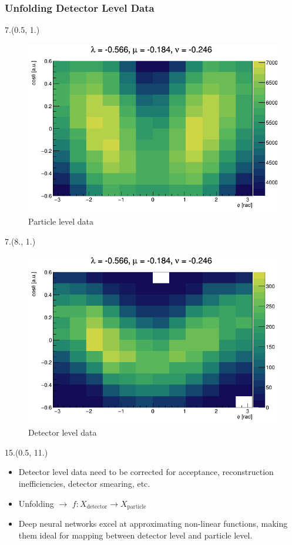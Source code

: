 \documentclass[12pt, xcolor={dvipsnames}, aspectratio = 169, sans, mathserif]{beamer}
\newenvironment{List}[2]
{\begin{textblock}{#1}#2
\begin{itemize}}
{\end{itemize}
\end{textblock}}
\newenvironment{Pic}[2]
{\begin{textblock}{#1}#2
\begin{figure}}
{\end{figure}
\end{textblock}}
\begin{document}
\begin{frame}
\frametitle{Unfolding Detector Level Data}

\begin{Pic}{7.}{(0.5, 1.)}
  \caption{Particle level data}
  \includegraphics[width=7.cm]{imgs/particle_level.png}
\end{Pic}

\begin{Pic}{7.}{(8., 1.)}
  \caption{Detector level data}
  \includegraphics[width=7.cm]{imgs/detector_level.png}
\end{Pic}

\begin{List}{15.}{(0.5, 11.)}

  \item Detector level data need to be corrected for acceptance, reconstruction inefficiencies, detector smearing, etc.

  \item Unfolding $\rightarrow$ $f: X_{\text{detector}} \rightarrow X_{\text{particle}}$

  \item Deep neural networks excel at approximating non-linear functions, making them ideal for mapping between detector level and particle level.
\end{List}

\end{frame}
\end{document}
